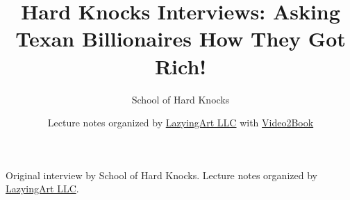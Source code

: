 \documentclass[11pt,oneside]{book}
\begin{document}
\frontmatter
\title{Hard Knocks Interviews: Asking Texan Billionaires How They Got Rich!}
\author{School of Hard Knocks}
\date{Lecture notes organized by \href{https://lazying.art}{LazyingArt LLC} with \href{https://github.com/lachlanchen/Video2Book}{Video2Book}}
\maketitle
\begin{center}
\small Original interview by School of Hard Knocks. Lecture notes organized by \href{https://lazying.art}{LazyingArt LLC}.
\end{center}
\clearpage
\mainmatter

\end{document}
